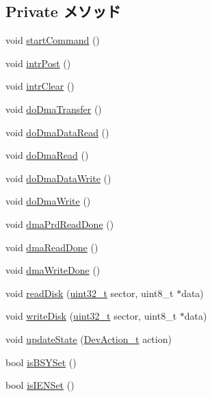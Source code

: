 \subsection*{Private メソッド}
\begin{DoxyCompactItemize}
\item 
void \hyperlink{classIdeDisk_a64f80702e39e45d2a65869911928c8ca}{startCommand} ()
\item 
void \hyperlink{classIdeDisk_aba6fa755ca152cedafeb4150da6a2493}{intrPost} ()
\item 
void \hyperlink{classIdeDisk_ac02b8a3b8685eca8bb4b237b29dfc762}{intrClear} ()
\item 
void \hyperlink{classIdeDisk_aa620b27b5598b2b7590329b64291460d}{doDmaTransfer} ()
\item 
void \hyperlink{classIdeDisk_aac34c7bd9c30398a876820e7bf616b72}{doDmaDataRead} ()
\item 
void \hyperlink{classIdeDisk_a4349f9ce6cbcc189128ed2968e74e497}{doDmaRead} ()
\item 
void \hyperlink{classIdeDisk_ae0d5ccabc77ef46a2850230fcf2e44de}{doDmaDataWrite} ()
\item 
void \hyperlink{classIdeDisk_ae547bc5391513f6cea7d857dc015f5da}{doDmaWrite} ()
\item 
void \hyperlink{classIdeDisk_a251a4f7092f0f261661c759eb4cdbd9b}{dmaPrdReadDone} ()
\item 
void \hyperlink{classIdeDisk_a2854a0676c5ef05d69512cabd994959c}{dmaReadDone} ()
\item 
void \hyperlink{classIdeDisk_a830e4a686d005a80a9fbf09c5d6d493e}{dmaWriteDone} ()
\item 
void \hyperlink{classIdeDisk_a8df41040225176356e649c3d35e11c62}{readDisk} (\hyperlink{Type_8hh_a435d1572bf3f880d55459d9805097f62}{uint32\_\-t} sector, uint8\_\-t $\ast$data)
\item 
void \hyperlink{classIdeDisk_aaf5688ef23ac188d55decc9021229d43}{writeDisk} (\hyperlink{Type_8hh_a435d1572bf3f880d55459d9805097f62}{uint32\_\-t} sector, uint8\_\-t $\ast$data)
\item 
void \hyperlink{classIdeDisk_a24fb6794cfae6f84b380080e7501959e}{updateState} (\hyperlink{ide__disk_8hh_ab9a7252f05d40d629a2b3e780862846c}{DevAction\_\-t} action)
\item 
bool \hyperlink{classIdeDisk_a61117d164479a7bbd3ed3d9afc8e261b}{isBSYSet} ()
\item 
bool \hyperlink{classIdeDisk_a3e0ad2d309fc4a7aaa7a8af8b09d2cc0}{isIENSet} ()
\item 

\end{DoxyCompactItemize}
